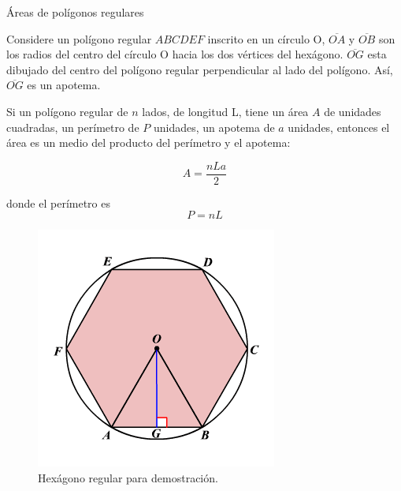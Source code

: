 \begin{infocard}{Áreas de polígonos regulares}
    \begin{minipage}{.6\textwidth}
        Considere un polígono regular $ABCDEF$ inscrito en un círculo O, $\overline{OA}$ y $\overline{OB}$  son los radios del centro del círculo O hacia los dos vértices del hexágono. $\overline{OG}$ esta dibujado del centro del polígono regular perpendicular al lado del polígono. Así, $\overline{OG}$ es un apotema.

        Si un polígono regular de $n$ lados, de longitud L, tiene un área $A$ de unidades cuadradas, un perímetro de $P$ unidades, un apotema de $a$ unidades, entonces el área es un medio del producto del perímetro y el apotema:

        \[A=\dfrac{nLa}{2}\]

        donde el perímetro es \[P=nL\]
    \end{minipage}\hfill
    \begin{minipage}{.3\textwidth}
        \begin{figure}[H]
            \centering
            \includegraphics[width=0.9\linewidth]{../images/apothem}
            \caption{Hexágono regular para demostración.}
            \label{fig:}
        \end{figure}
    \end{minipage}

\end{infocard}
